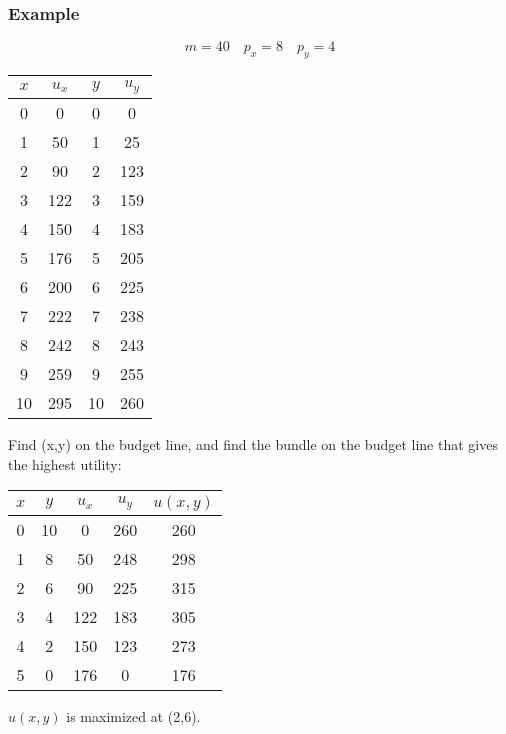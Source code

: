 \documentclass[letterpaper, 12pt]{article}
\begin{document}
\subsubsection{Example}
\[ m = 40 \quad p_{x} = 8 \quad p_{y} = 4 \]
\begin{center}
  \begin{tabular}{|c|c|c|c|}
    \hline
    \( x \) & \( u_{x} \) & \(y \) & \( u_{y} \) \\ \hline
    0       & 0           & 0      & 0           \\ \hline
    1       & 50          & 1      & 25          \\ \hline
    2       & 90          & 2      & 123         \\ \hline
    3       & 122         & 3      & 159         \\ \hline
    4       & 150         & 4      & 183         \\ \hline
    5       & 176         & 5      & 205         \\ \hline
    6       & 200         & 6      & 225         \\ \hline
    7       & 222         & 7      & 238         \\ \hline
    8       & 242         & 8      & 243         \\ \hline
    9       & 259         & 9      & 255         \\ \hline
    10      & 295         & 10     & 260         \\ \hline
  \end{tabular}
\end{center}
Find (x,y) on the budget line, and find the bundle on the budget line that
gives the highest utility:
\begin{center}
  \begin{tabular}{|c|c|c|c|c|}
    \hline
    \( x \) & \( y \) & \( u_{x} \) & \( u_{y} \) & \( u(x,y) \) \\ \hline
    0       & 10      & 0           & 260         & 260          \\ \hline
    1       & 8       & 50          & 248         & 298          \\ \hline
    2       & 6       & 90          & 225         & 315          \\ \hline
    3       & 4       & 122         & 183         & 305          \\ \hline
    4       & 2       & 150         & 123         & 273          \\ \hline
    5       & 0       & 176         & 0           & 176          \\ \hline
  \end{tabular}
\end{center}
\( u(x,y) \) is maximized at (2,6).
\end{document}
